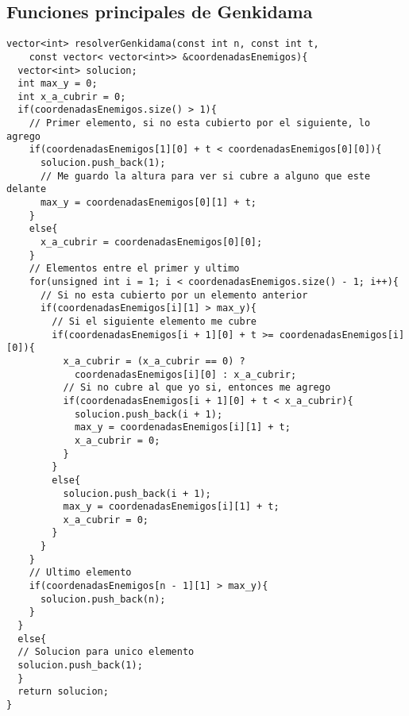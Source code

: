 \subsection{Funciones principales de Genkidama}
\begin{lstlisting}
vector<int> resolverGenkidama(const int n, const int t, 
	const vector< vector<int>> &coordenadasEnemigos){
  vector<int> solucion;
  int max_y = 0;
  int x_a_cubrir = 0;
  if(coordenadasEnemigos.size() > 1){
    // Primer elemento, si no esta cubierto por el siguiente, lo agrego
    if(coordenadasEnemigos[1][0] + t < coordenadasEnemigos[0][0]){
      solucion.push_back(1);
      // Me guardo la altura para ver si cubre a alguno que este delante
      max_y = coordenadasEnemigos[0][1] + t;
    }
    else{
      x_a_cubrir = coordenadasEnemigos[0][0];
    }
    // Elementos entre el primer y ultimo
    for(unsigned int i = 1; i < coordenadasEnemigos.size() - 1; i++){
      // Si no esta cubierto por un elemento anterior
      if(coordenadasEnemigos[i][1] > max_y){
        // Si el siguiente elemento me cubre
        if(coordenadasEnemigos[i + 1][0] + t >= coordenadasEnemigos[i][0]){
          x_a_cubrir = (x_a_cubrir == 0) ? 
            coordenadasEnemigos[i][0] : x_a_cubrir;
          // Si no cubre al que yo si, entonces me agrego
          if(coordenadasEnemigos[i + 1][0] + t < x_a_cubrir){
            solucion.push_back(i + 1);
            max_y = coordenadasEnemigos[i][1] + t;
            x_a_cubrir = 0;
          }
        }
        else{
          solucion.push_back(i + 1);
          max_y = coordenadasEnemigos[i][1] + t;
          x_a_cubrir = 0;
        }
      }
    }
    // Ultimo elemento
    if(coordenadasEnemigos[n - 1][1] > max_y){
      solucion.push_back(n);
    }
  }
  else{
  // Solucion para unico elemento
  solucion.push_back(1);
  }
  return solucion;
}
\end{lstlisting}

